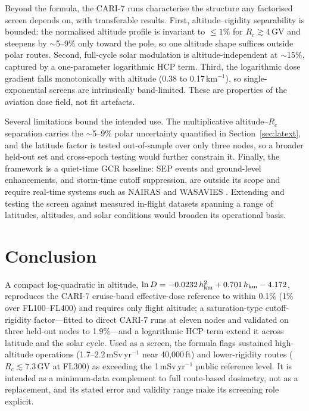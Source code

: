 \documentclass[11pt,a4paper]{article}
\begin{document}
Beyond the formula, the CARI-7 runs characterise the structure any
factorised screen depends on, with transferable results. First,
altitude--rigidity separability is bounded: the normalised altitude profile
is invariant to $\le1\%$ for $R_c\gtrsim4$\,GV and steepens by
$\sim$5--9\% only toward the pole, so one altitude shape suffices outside
polar routes. Second, full-cycle solar modulation is altitude-independent
at $\sim$15\%, captured by a one-parameter logarithmic HCP term. Third, the
logarithmic dose gradient falls monotonically with altitude (0.38 to
0.17\,km$^{-1}$), so single-exponential screens are intrinsically
band-limited. These are properties of the aviation dose field, not fit
artefacts.

Several limitations bound the intended use. The multiplicative
altitude--$R_c$ separation carries the $\sim$5--9\% polar uncertainty
quantified in Section~\ref{sec:latext}, and the latitude factor is tested
out-of-sample over only three nodes, so a broader held-out set and
cross-epoch testing would further constrain it. Finally, the framework is a
quiet-time GCR baseline: SEP
events and ground-level enhancements, and storm-time cutoff suppression,
are outside its scope and require real-time systems such as NAIRAS and
WASAVIES \citep{mertens2013,mewaldt2005,kubo2015wasavies,sato2018wasavies,meier2014swindex}.
Extending and testing the screen
against measured in-flight datasets spanning a range of latitudes,
altitudes, and solar conditions would broaden its operational basis.

\section{Conclusion}

A compact log-quadratic in altitude,
$\ln D=-0.0232\,h_{\rm km}^{2}+0.701\,h_{\rm km}-4.172$, reproduces the
CARI-7 cruise-band effective-dose reference to within 0.1\% (1\% over
FL100--FL400) and requires only flight altitude; a saturation-type
cutoff-rigidity factor---fitted to direct CARI-7 runs at eleven nodes and
validated on three held-out nodes to 1.9\%---and a logarithmic HCP term
extend it across latitude and the solar cycle. Used as a screen, the
formula flags sustained high-altitude operations
(1.7--2.2\,mSv\,yr$^{-1}$ near 40{,}000\,ft) and lower-rigidity routes
($R_c\lesssim7.3$\,GV at FL300) as exceeding the 1\,mSv\,yr$^{-1}$ public
reference level. It is intended as a minimum-data complement to full
route-based dosimetry, not as a replacement, and its stated error and
validity range make its screening role explicit.
\end{document}
